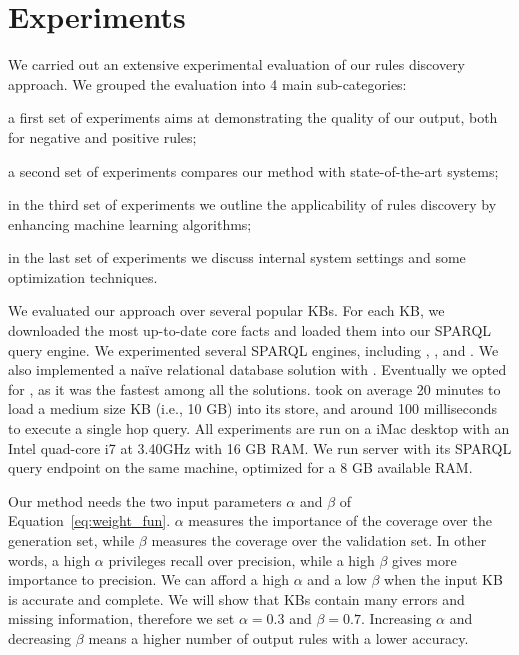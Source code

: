 \section{Experiments} \label{sec:experiment}
We carried out an extensive experimental evaluation of our rules discovery approach.
We grouped the evaluation into 4 main sub-categories: 
\begin{inparaenum}[\itshape(i)]
	\item a first set of experiments aims at demonstrating the quality of our output, both for negative and positive rules;
	\item a second set of experiments compares our method with state-of-the-art systems;
	\item in the third set of experiments we outline the applicability of rules discovery by enhancing machine learning algorithms;
	\item in the last set of experiments we discuss internal system settings and some optimization techniques.
\end{inparaenum}

We evaluated our approach over several popular KBs. For each KB, we downloaded the most up-to-date core facts and loaded them into our SPARQL query engine. We experimented several SPARQL engines, including , , and . We also implemented a na\"ive relational database solution with . Eventually we opted for , as it was the fastest among all the solutions.  took on average 20 minutes to load a medium size KB (i.e., 10 GB) into its store, and around 100 milliseconds to execute a single hop query. All experiments are run on a iMac desktop with
an Intel quad-core i7 at 3.40GHz with 16 GB RAM. We run  server with its SPARQL query endpoint on the same machine, optimized for a 8 GB available RAM.

Our method needs the two input parameters $\alpha$ and $\beta$ of Equation~\ref{eq:weight_fun}. $\alpha$ measures the importance of the coverage over the generation set, while $\beta$ measures the coverage over the validation set. In other words, a high $\alpha$ privileges recall over precision, while a high $\beta$ gives more importance to precision. We can afford a high $\alpha$ and a low $\beta$ when the input KB is accurate and complete. We will show that KBs contain many errors and missing information, therefore we set $\alpha = 0.3$ and $\beta = 0.7$. Increasing $\alpha$ and decreasing $\beta$ means a higher number of output rules with a lower accuracy. 


